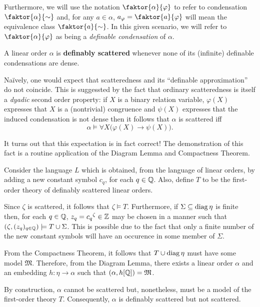 Furthermore, we will use the notation $\faktor{\alpha}{\varphi}$ to refer
to condensation $\faktor{\alpha}{\sim}$ and, for any $a\in\alpha$,
$a_\varphi=\faktor{a}{\varphi}$ will mean the equivalence class
$\faktor{a}{\sim}$.  In this given scenario, we will refer to
$\faktor{\alpha}{\varphi}$ as being a \textit{definable condensation} of
$\alpha$.

\begin{dfn}
	A linear order $\alpha$ is \textbf{definably scattered} whenever none of its
	(infinite) definable condensations are dense.
\end{dfn}

Na\"ively, one would expect that scatteredness and its ``definable
approximation'' do not coincide.  This is suggessted by the fact that ordinary
scatteredness is itself a \textit{dyadic} second order property: if $X$ is a
binary relation variable, $\varphi(X)$ expresses that $X$ is a (nontrivial)
congruence and $\psi(X)$ expresses that the induced condensation is not dense
then it follows that $\alpha$ is scattered iff
\begin{equation}
	\alpha\models\forall X\big(\varphi(X)\rightarrow\psi(X)\big).
\end{equation}

It turns out that this expectation is in fact correct!  The demonstration of
this fact is a routine application of the Diagram Lemma and Compactness Theorem.

\begin{exm}
	\label{exm:dscat}
	Consider the language $L$ which is obtained, from the language of linear
	orders, by adding a new constant symbol $c_q$, for each $q\in\mathbb{Q}$.  Also,
	define $T$ to be the first-order theory of definably scattered linear
	orders.

	Since $\zeta$ is scattered, it follows that $\zeta\models T$.  Furthermore,
	if $\Sigma\subseteq\operatorname{diag}\eta$ is finite then, for each $q\in\mathbb{Q}$,
	$z_q={c_q}^\zeta\in\mathbb{Z}$ may be chosen in a manner such that
	$(\zeta,(z_q)_{q\in\mathbb{Q}})\models T\cup\Sigma$.  This is possible due
	to the fact that only a finite number of the new constant symbols will have
	an occurence in some member of $\Sigma$.

	From the Compactness Theorem, it follows that $T\cup\operatorname{diag}\eta$ must have
	some model $\mathfrak{M}$.  Therefore, from the Diagram Lemma, there exists
	a linear order $\alpha$ and an embedding $h\colon\eta\to\alpha$ such that
	$(\alpha,h[\mathbb{Q}])=\mathfrak{M}$.

	By construction, $\alpha$ cannot be scattered but, nonetheless, must
	be a model of the first-order theory $T$.  Consequently, $\alpha$ is
	definably scattered but not scattered.
\end{exm}


